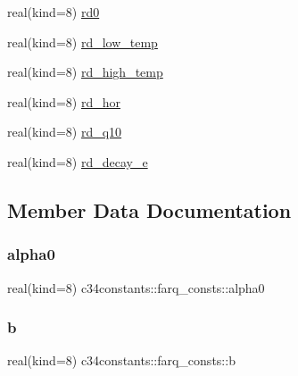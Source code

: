 \begin{DoxyCompactItemize}
\item 
real(kind=8) \hyperlink{structc34constants_1_1farq__consts_a69a48d8df8477c75ca42fa00fc9b7f4e}{rd0}
\item 
real(kind=8) \hyperlink{structc34constants_1_1farq__consts_aed622c485dc8a91b7c7ec180a6a905b3}{rd\+\_\+low\+\_\+temp}
\item 
real(kind=8) \hyperlink{structc34constants_1_1farq__consts_aead3f1dc90f03eca3990e692d2cceb05}{rd\+\_\+high\+\_\+temp}
\item 
real(kind=8) \hyperlink{structc34constants_1_1farq__consts_aed74b55c0daee2fe235e1f948dac1a93}{rd\+\_\+hor}
\item 
real(kind=8) \hyperlink{structc34constants_1_1farq__consts_a4bb81d3f16d5f934ce4c07c1a47ad13f}{rd\+\_\+q10}
\item 
real(kind=8) \hyperlink{structc34constants_1_1farq__consts_a3ff8dd1a8307cc3da9f1e082c0abd2f7}{rd\+\_\+decay\+\_\+e}
\end{DoxyCompactItemize}


\subsection{Member Data Documentation}
\mbox{\label{structc34constants_1_1farq__consts_ac07e1eade4d8432242f00aafbbc04b32}} 
\subsubsection{\texorpdfstring{alpha0}{alpha0}}
{\footnotesize\ttfamily real(kind=8) c34constants\+::farq\+\_\+consts\+::alpha0}

\mbox{\label{structc34constants_1_1farq__consts_a02ff4801f693aa83da862b00607461d3}} 
\subsubsection{\texorpdfstring{b}{b}}
{\footnotesize\ttfamily real(kind=8) c34constants\+::farq\+\_\+consts\+::b}

\mbox{\label{structc34constants_1_1farq__consts_ae8edb029d2bb0b51d6321d09650b5cf4}} 
